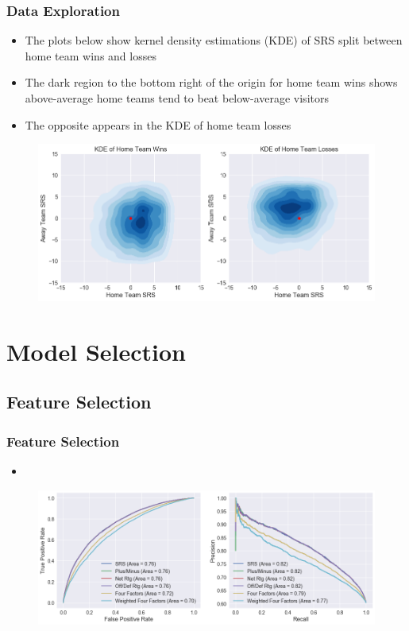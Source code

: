 \documentclass{beamer}
\begin{document}
\begin{frame}
\frametitle{Data Exploration}
\begin{itemize}
    \item The plots below show kernel density estimations (KDE) of SRS split between home team wins and losses
    \item The dark region to the bottom right of the origin for home team wins shows above-average home teams tend to beat below-average visitors
    \item The opposite appears in the KDE of home team losses
\end{itemize}
\begin{figure}
\includegraphics[scale=0.35]{../docs/assets/images/data-exploration/srs-win-loss-kde.png}
\end{figure}
\end{frame}

\section{Model Selection}

\subsection{Feature Selection}
\begin{frame}
\frametitle{Feature Selection}
\begin{itemize}
    \item
\end{itemize}
\begin{figure}
\includegraphics[scale=0.35]{../docs/assets/images/feature-selection/cross-validation-comparison.png}
\end{figure}
\end{frame}
\end{document}
